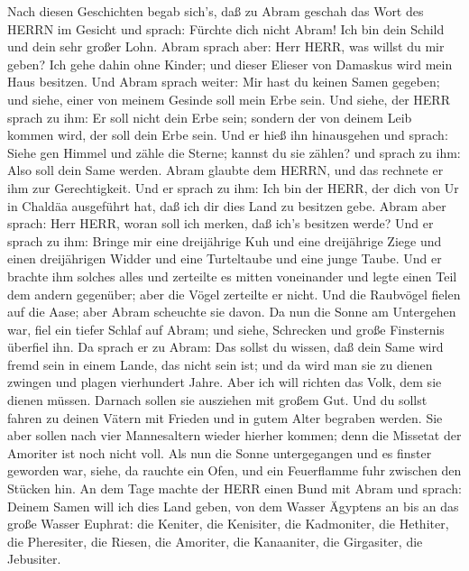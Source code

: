  Nach diesen Geschichten begab sich's, daß zu Abram geschah
das Wort des HERRN im Gesicht und sprach: Fürchte dich nicht Abram! Ich
bin dein Schild und dein sehr großer Lohn.  Abram sprach
aber: Herr HERR, was willst du mir geben? Ich gehe dahin ohne Kinder;
und dieser Elieser von Damaskus wird mein Haus besitzen. 
Und Abram sprach weiter: Mir hast du keinen Samen gegeben; und siehe,
einer von meinem Gesinde soll mein Erbe sein.  Und siehe,
der HERR sprach zu ihm: Er soll nicht dein Erbe sein; sondern der von
deinem Leib kommen wird, der soll dein Erbe sein.  Und er
hieß ihn hinausgehen und sprach: Siehe gen Himmel und zähle die Sterne;
kannst du sie zählen? und sprach zu ihm: Also soll dein Same werden.
 Abram glaubte dem HERRN, und das rechnete er ihm zur
Gerechtigkeit.  Und er sprach zu ihm: Ich bin der HERR, der
dich von Ur in Chaldäa ausgeführt hat, daß ich dir dies Land zu besitzen
gebe.  Abram aber sprach: Herr HERR, woran soll ich merken,
daß ich's besitzen werde?  Und er sprach zu ihm: Bringe mir
eine dreijährige Kuh und eine dreijährige Ziege und einen dreijährigen
Widder und eine Turteltaube und eine junge Taube.  Und er
brachte ihm solches alles und zerteilte es mitten voneinander und legte
einen Teil dem andern gegenüber; aber die Vögel zerteilte er nicht.
 Und die Raubvögel fielen auf die Aase; aber Abram
scheuchte sie davon.  Da nun die Sonne am Untergehen war,
fiel ein tiefer Schlaf auf Abram; und siehe, Schrecken und große
Finsternis überfiel ihn.  Da sprach er zu Abram: Das sollst
du wissen, daß dein Same wird fremd sein in einem Lande, das nicht sein
ist; und da wird man sie zu dienen zwingen und plagen vierhundert Jahre.
 Aber ich will richten das Volk, dem sie dienen müssen.
Darnach sollen sie ausziehen mit großem Gut.  Und du sollst
fahren zu deinen Vätern mit Frieden und in gutem Alter begraben werden.
 Sie aber sollen nach vier Mannesaltern wieder hierher
kommen; denn die Missetat der Amoriter ist noch nicht voll.
 Als nun die Sonne untergegangen und es finster geworden
war, siehe, da rauchte ein Ofen, und ein Feuerflamme fuhr zwischen den
Stücken hin.  An dem Tage machte der HERR einen Bund mit
Abram und sprach: Deinem Samen will ich dies Land geben, von dem Wasser
Ägyptens an bis an das große Wasser Euphrat:  die Keniter,
die Kenisiter, die Kadmoniter,  die Hethiter, die
Pheresiter, die Riesen,  die Amoriter, die Kanaaniter, die
Girgasiter, die Jebusiter.

